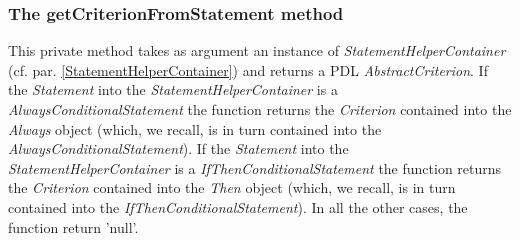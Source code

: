 \documentclass[a4paper,11pt] {ivoa}
\begin{document}
\subsubsection{The getCriterionFromStatement method}
This private method takes as argument an instance of {\it StatementHelperContainer} (cf. par. \ref{StatementHelperContainer}) and returns a PDL {\it AbstractCriterion}. If the {\it Statement} into the {\it StatementHelperContainer} is a {\it AlwaysConditionalStatement} the function returns the {\it Criterion} contained into the {\it Always} object (which, we recall, is in turn contained into the {\it AlwaysConditionalStatement}). If the {\it Statement} into the {\it StatementHelperContainer} is a {\it IfThenConditionalStatement} the function returns the {\it Criterion} contained into the {\it Then} object (which, we recall, is in turn contained into the {\it IfThenConditionalStatement}). In all the other cases, the function return 'null'.
\end{document}
